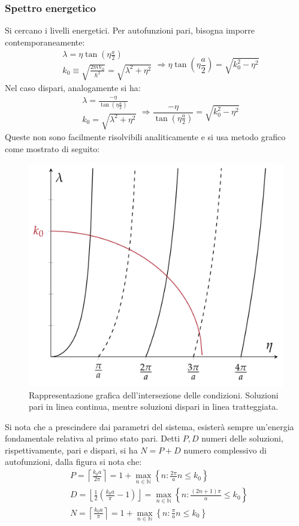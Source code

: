 \documentclass[11pt, a4paper]{scrartcl} %
\numberwithin{equation}{subsection}
\theoremstyle{style2}
\theoremstyle{style1}
\begin{document}
\subsubsection{Spettro energetico}
Si cercano i livelli energetici.
Per autofunzioni pari, bisogna imporre contemporaneamente:
\begin{equation}
	\begin{split}
		&\lambda  = \eta \tan \left(\eta \frac{a}{2}\right) \\
		&k_0 \equiv \sqrt{\frac{2m V_0}{\hbar ^2}} = \sqrt{\lambda ^2 + \eta^2} 
	\end{split} \Rightarrow \eta \tan\left(\eta \frac{a}{2}\right) = \sqrt{k_0^2 - \eta^2} 
\end{equation}
Nel caso dispari, analogamente si ha:
\begin{equation}
	\begin{split}
		&\lambda  = \frac{- \eta}{ \tan \left(\eta \frac{a}{2}\right) }\\
		&k_0 = \sqrt{\lambda ^2 + \eta^2} 
	\end{split} \Rightarrow \frac{-\eta}{\tan \left(\eta \frac{a}{2}\right) } = \sqrt{k_0^2 - \eta^2} 
\end{equation}
Queste non sono facilmente risolvibili analiticamente e si usa metodo grafico come mostrato di seguito:
\begin{figure}[h!]
	\centering
	\includegraphics[width=.4\columnwidth]{well-sol.png}
	\caption{Rappresentazione grafica dell'intersezione delle condizioni. Soluzioni pari in linea continua, mentre soluzioni dispari in linea tratteggiata.}
\end{figure}
Si nota che a prescindere dai parametri del sistema, esister\`a sempre un'energia fondamentale relativa al primo stato pari. 
Detti $P,D$ numeri delle soluzioni, rispettivamente, pari e dispari, si ha $N = P+D$ numero complessivo di autofunzioni, dalla figura si nota che:
\begin{equation}
	\begin{split}
		&P = \left\lceil \frac{k_0 a }{2\pi} \right\rceil = 1 + \max_{n \in \mathbb{N}}  \left\{ n : \frac{2\pi}{a}n \le k_0 \right\} \\
		& D = \left\lfloor \frac{1}{2}\left(\frac{k_0 a }{\pi}- 1\right)  \right\rfloor= \max_{n \in \mathbb{N}}  \left\{ n : \frac{(2n+1)\pi}{a} \le k_0 \right\} \\
		& N = \left\lceil \frac{k_0 a}{\pi} \right\rceil = 1+ \max_{n \in \mathbb{N}} \left\{ n : \frac{\pi}{a} n \le k_0 \right\} 
	\end{split}
\end{equation}
\end{document}
